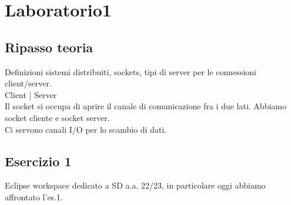 \chapter{Laboratorio1}
\section{Ripasso teoria}
Definizioni sistemi distribuiti, sockets, tipi di server per le connessioni client/server.
\\Client            |           Server
\\Il socket si occupa di aprire il canale di comunicazione fra i due lati. Abbiamo socket cliente e socket server.
\\Ci servono canali I/O per lo scambio di dati.
\section{Esercizio 1}
Eclipse workspace dedicato a SD a.a. 22/23, in particolare oggi abbiamo affrontato l'es.1.